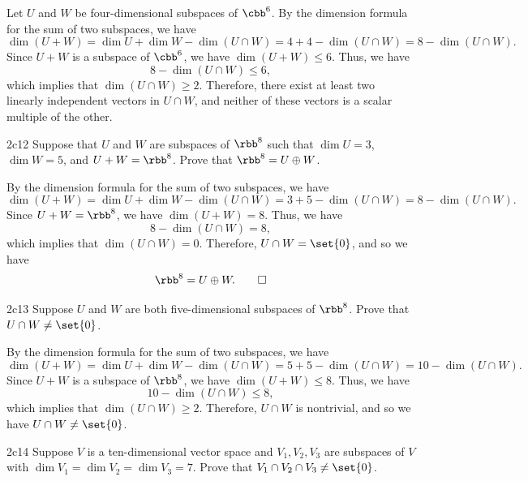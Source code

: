 \begin{sol}
    Let $U$ and $W$ be four-dimensional subspaces of $\cbb^6$.
	By the dimension formula for the sum of two subspaces, we have
    \[
    	\dim(U + W) = \dim U + \dim W - \dim(U \cap W) = 4 + 4 - \dim(U \cap W) = 8 - \dim(U \cap W).
    \]
    Since $U + W$ is a subspace of $\cbb^6$, we have $\dim(U + W) \leq 6$.
	Thus, we have
    \[
    	8 - \dim(U \cap W) \leq 6,
    \]
    which implies that $\dim(U \cap W) \geq 2$.
	Therefore, there exist at least two linearly independent vectors in $U \cap W$, and neither of these vectors is a scalar multiple of the other.
\end{sol}

\begin{exercise}{2c12}
    Suppose that $U$ and $W$ are subspaces of $\rbb^8$ such that $\dim U = 3$, $\dim W = 5$, and $U + W = \rbb^8$.
	Prove that $\rbb^8 = U \oplus W$.
\end{exercise}

\begin{sol}
    By the dimension formula for the sum of two subspaces, we have
    \[
    	\dim(U + W) = \dim U + \dim W - \dim(U \cap W) = 3 + 5 - \dim(U \cap W) = 8 - \dim(U \cap W).
    \]
    Since $U + W = \rbb^8$, we have $\dim(U + W) = 8$.
	Thus, we have
    \[
    	8 - \dim(U \cap W) = 8,
    \]
    which implies that $\dim(U \cap W) = 0$.
	Therefore, $U \cap W = \set{0}$, and so we have
    \[
    	\rbb^8 = U \oplus W. \qedhere
    \]
\end{sol}

\begin{exercise}{2c13}
    Suppose $U$ and $W$ are both five-dimensional subspaces of $\rbb^8$.
	Prove that $U \cap W \neq \set{0}$.
\end{exercise}

\begin{sol}
    By the dimension formula for the sum of two subspaces, we have
    \[
    	\dim(U + W) = \dim U + \dim W - \dim(U \cap W) = 5 + 5 - \dim(U \cap W) = 10 - \dim(U \cap W).
    \]
    Since $U + W$ is a subspace of $\rbb^8$, we have $\dim(U + W) \leq 8$.
	Thus, we have
    \[
    	10 - \dim(U \cap W) \leq 8,
    \]
    which implies that $\dim(U \cap W) \geq 2$.
	Therefore, $U \cap W$ is nontrivial, and so we have $U \cap W \neq \set{0}$.
\end{sol}

\begin{exercise}{2c14}
    Suppose $V$ is a ten-dimensional vector space and $V_1, V_2, V_3$ are subspaces of $V$ with $\dim V_1 = \dim V_2 = \dim V_3 = 7$.
	Prove that $V_1 \cap V_2 \cap V_3 \neq \set{0}$.
\end{exercise}

